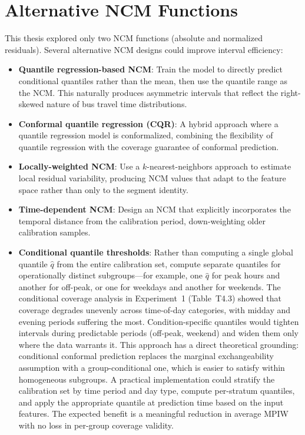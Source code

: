 \section{Alternative NCM Functions}
\label{sec:fw_ncm}

This thesis explored only two NCM functions (absolute and normalized residuals). Several alternative NCM designs could improve interval efficiency:

\begin{itemize}
    \item \textbf{Quantile regression-based NCM}: Train the model to directly predict conditional quantiles rather than the mean, then use the quantile range as the NCM. This naturally produces asymmetric intervals that reflect the right-skewed nature of bus travel time distributions.

    \item \textbf{Conformal quantile regression (CQR)}: A hybrid approach where a quantile regression model is conformalized, combining the flexibility of quantile regression with the coverage guarantee of conformal prediction.

    \item \textbf{Locally-weighted NCM}: Use a $k$-nearest-neighbors approach to estimate local residual variability, producing NCM values that adapt to the feature space rather than only to the segment identity.

    \item \textbf{Time-dependent NCM}: Design an NCM that explicitly incorporates the temporal distance from the calibration period, down-weighting older calibration samples.

    \item \textbf{Conditional quantile thresholds}: Rather than computing a single global quantile $\hat{q}$ from the entire calibration set, compute separate quantiles for operationally distinct subgroups---for example, one $\hat{q}$ for peak hours and another for off-peak, or one for weekdays and another for weekends. The conditional coverage analysis in Experiment~1 (Table~T4.3) showed that coverage degrades unevenly across time-of-day categories, with midday and evening periods suffering the most. Condition-specific quantiles would tighten intervals during predictable periods (off-peak, weekend) and widen them only where the data warrants it. This approach has a direct theoretical grounding: conditional conformal prediction replaces the marginal exchangeability assumption with a group-conditional one, which is easier to satisfy within homogeneous subgroups. A practical implementation could stratify the calibration set by time period and day type, compute per-stratum quantiles, and apply the appropriate quantile at prediction time based on the input features. The expected benefit is a meaningful reduction in average MPIW with no loss in per-group coverage validity.
\end{itemize}


